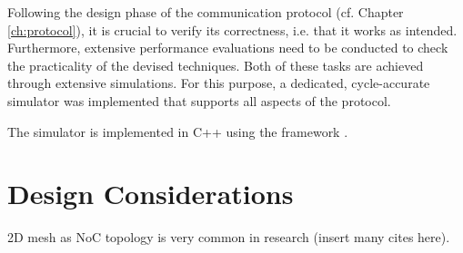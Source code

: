 Following the design phase of the communication protocol (cf. Chapter \ref{ch:protocol}), it is crucial to verify its correctness, i.e. that it works as
intended. Furthermore, extensive performance evaluations need to be conducted to check the practicality of the devised techniques. Both of these tasks
are achieved through extensive simulations. For this purpose, a dedicated, cycle-accurate simulator was implemented that supports all aspects of the
protocol.

The simulator is implemented in C++ using the \textit{\omnet} framework \cite{omnet}.

\section{Design Considerations}
2D mesh as NoC topology is very common in research (insert many cites here).
